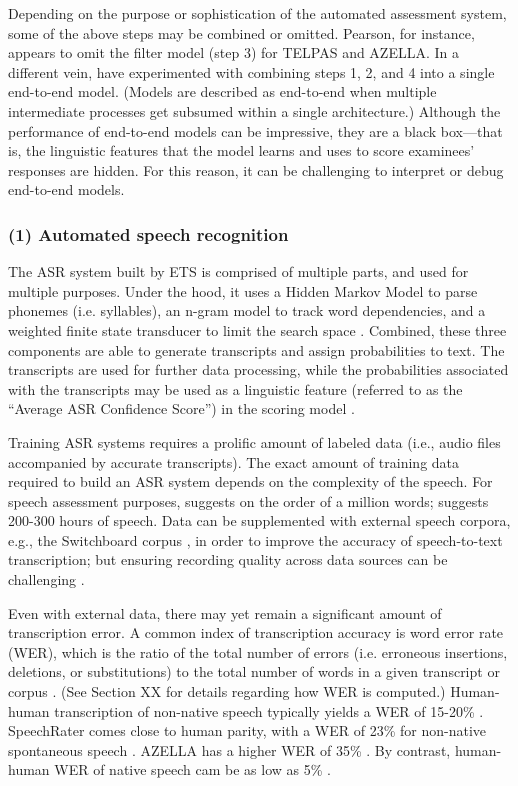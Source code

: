 \documentclass [PhD] {uclathes}
\begin{document}
Depending on the purpose or sophistication of the automated assessment system, some of the above steps may be combined or omitted. Pearson, for instance, appears to omit the filter model (step 3) for TELPAS and AZELLA. In a different vein, \citet{chen2018end} have experimented with combining steps 1, 2, and 4 into a single end-to-end model. (Models are described as end-to-end when multiple intermediate processes get subsumed within a single architecture.) Although the performance of end-to-end models can be impressive, they are a black box—that is, the linguistic features that the model learns and uses to score examinees’ responses are hidden. For this reason, it can be challenging to interpret or debug end-to-end models.

\subsubsection{(1) Automated speech recognition}

The ASR system built by ETS is comprised of multiple parts, and used for multiple purposes. Under the hood, it uses a Hidden Markov Model to parse phonemes (i.e. syllables), an n-gram model to track word dependencies, and a weighted finite state transducer to limit the search space \citep{qian2019automatic}. Combined, these three components are able to generate transcripts and assign probabilities to text. The transcripts are used for further data processing, while the probabilities associated with the transcripts may be used as a linguistic feature (referred to as the “Average ASR Confidence Score”) in the scoring model \citep{zhang2019assessing}.

Training ASR systems requires a prolific amount of labeled data (i.e., audio files accompanied by accurate transcripts). The exact amount of training data required to build an ASR system depends on the complexity of the speech. For speech assessment purposes, \citet{qian2019automatic} suggests on the order of a million words; \citet{evanini2017approaches} suggests 200-300 hours of speech. Data can be supplemented with external speech corpora, e.g., the Switchboard corpus \citep{godfrey1997switchboard}, in order to improve the accuracy of speech-to-text transcription; but ensuring recording quality across data sources can be challenging \citep{qian2019automatic}.

Even with external data, there may yet remain a significant amount of transcription error. A common index of transcription accuracy is word error rate (WER), which is the ratio of the total number of errors (i.e. erroneous insertions, deletions, or substitutions) to the total number of words in a given transcript or corpus \citep{qian2019automatic}. (See Section XX for details regarding how WER is computed.) Human-human transcription of non-native speech typically yields a WER of 15-20\% \citep{zechner2009}. SpeechRater comes close to human parity, with a WER of 23\% for non-native spontaneous speech \citep{tao2016exploring}. AZELLA has a higher WER of 35\% \citep{cheng2014automatic}. By contrast, human-human WER of native speech cam be as low as 5\% \citep{xiong2016achieving}.
\end{document}
